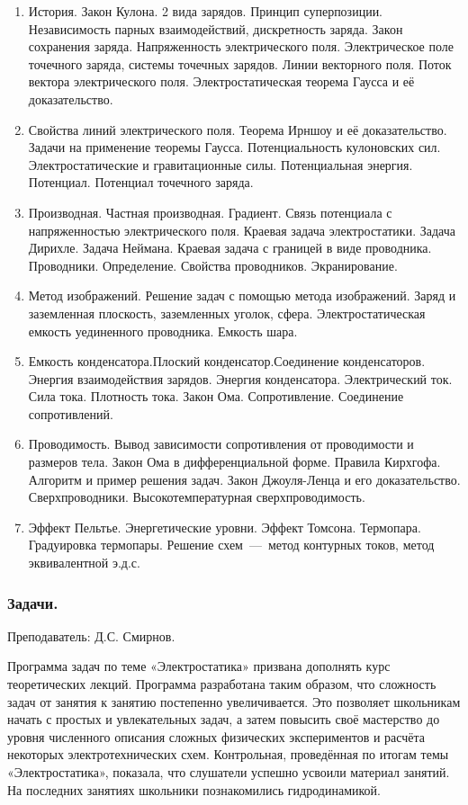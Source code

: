 \documentclass[12pt,a4paper,oneside]{scrartcl}
\begin{document}
\begin{enumerate}
\item История.  Закон Кулона. 2 вида зарядов.  Принцип
  суперпозиции. Независимость парных взаимодействий, дискретность
  заряда. Закон сохранения заряда. Напряженность электрического
  поля. Электрическое поле точечного заряда, системы точечных зарядов.
  Линии векторного поля. Поток вектора электрического поля.
  Электростатическая теорема Гаусса и её доказательство.
\item Свойства линий электрического поля. Теорема Ирншоу и её
  доказательство. Задачи на применение теоремы Гаусса.
  Потенциальность кулоновских сил. Электростатические и гравитационные
  силы. Потенциальная энергия. Потенциал. Потенциал точечного заряда.
\item Производная. Частная производная. Градиент. Связь потенциала с
  напряженностью электрического поля. Краевая задача
  электростатики. Задача Дирихле. Задача Неймана. Краевая задача с
  границей в виде проводника.  Проводники. Определение. Свойства
  проводников. Экранирование.
\item Метод изображений. Решение задач с помощью метода изображений.
  Заряд и заземленная плоскость, заземленных уголок, сфера.
  Электростатическая емкость уединенного проводника. Емкость шара.
\item Емкость конденсатора.Плоский конденсатор.Соединение
  конденсаторов. Энергия взаимодействия зарядов. Энергия
  конденсатора. Электрический ток. Сила тока. Плотность тока. Закон
  Ома. Сопротивление. Соединение сопротивлений.
\item Проводимость. Вывод зависимости сопротивления от проводимости и
  размеров тела. Закон Ома в дифференциальной форме. Правила
  Кирхгофа. Алгоритм и пример решения задач. Закон Джоуля-Ленца и его
  доказательство. Сверхпроводники. Высокотемпературная
  сверхпроводимость.
\item Эффект Пельтье. Энергетические уровни. Эффект
  Томсона. Термопара. Градуировка термопары. Решение схем~---~метод
  контурных токов, метод эквивалентной э.д.с.
\end{enumerate}

\subsubsection{Задачи.}
\label{sec:daily_10_problems}

\textsf{Преподаватель: Д.С. Смирнов.}

Программа задач по теме «Электростатика» призвана дополнять курс
теоретических лекций. Программа разработана таким образом, что
сложность задач от занятия к занятию постепенно увеличивается. Это
позволяет школьникам начать с простых и увлекательных задач, а затем
повысить своё мастерство до уровня численного описания сложных
физических экспериментов и расчёта некоторых электротехнических
схем. Контрольная, проведённая по итогам темы «Электростатика»,
показала, что слушатели успешно усвоили материал занятий. На последних
занятиях школьники познакомились гидродинамикой.
\end{document}
